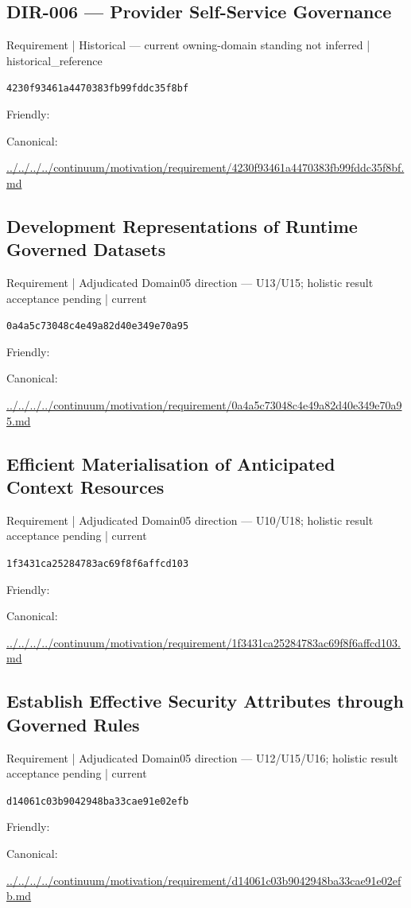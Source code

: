\documentclass[10pt,a4paper]{article}
\begin{document}
\subsection*{DIR-006 — Provider Self-Service Governance}
{\small Requirement | Historical — current owning-domain standing not inferred | historical\_reference}\par
\texttt{4230f93461a4470383fb99fddc35f8bf}\par
Friendly: \par
Canonical: \par
{\footnotesize\url{../../../../continuum/motivation/requirement/4230f93461a4470383fb99fddc35f8bf.md}}\par
\subsection*{Development Representations of Runtime Governed Datasets}
{\small Requirement | Adjudicated Domain05 direction — U13/U15; holistic result acceptance pending | current}\par
\texttt{0a4a5c73048c4e49a82d40e349e70a95}\par
Friendly: \par
Canonical: \par
{\footnotesize\url{../../../../continuum/motivation/requirement/0a4a5c73048c4e49a82d40e349e70a95.md}}\par
\subsection*{Efficient Materialisation of Anticipated Context Resources}
{\small Requirement | Adjudicated Domain05 direction — U10/U18; holistic result acceptance pending | current}\par
\texttt{1f3431ca25284783ac69f8f6affcd103}\par
Friendly: \par
Canonical: \par
{\footnotesize\url{../../../../continuum/motivation/requirement/1f3431ca25284783ac69f8f6affcd103.md}}\par
\subsection*{Establish Effective Security Attributes through Governed Rules}
{\small Requirement | Adjudicated Domain05 direction — U12/U15/U16; holistic result acceptance pending | current}\par
\texttt{d14061c03b9042948ba33cae91e02efb}\par
Friendly: \par
Canonical: \par
{\footnotesize\url{../../../../continuum/motivation/requirement/d14061c03b9042948ba33cae91e02efb.md}}\par
\end{document}
